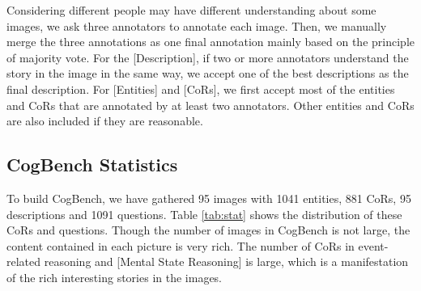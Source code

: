 Considering different people may have different understanding about some images, we ask three annotators to annotate each image. 
Then, we manually merge the three annotations as one final annotation mainly based on the principle of majority vote. 
For the [Description], if two or more annotators understand the story in the image in the same way, we accept one of the best descriptions as the final description.
For [Entities] and [CoRs], we first accept most of the entities and CoRs that are annotated by at least two annotators. 
Other entities and CoRs are also included if they are reasonable.





\subsection{CogBench Statistics}

To build CogBench, we have gathered 95 images with 1041 entities, 881 CoRs, 95 descriptions and 1091 questions. 
Table \ref{tab:stat} shows the distribution of these CoRs and questions.
Though the number of images in CogBench is not large, the content contained in each picture is very rich.
The number of CoRs in event-related reasoning and [Mental State Reasoning] is large, which is a manifestation of the rich interesting stories in the images.



